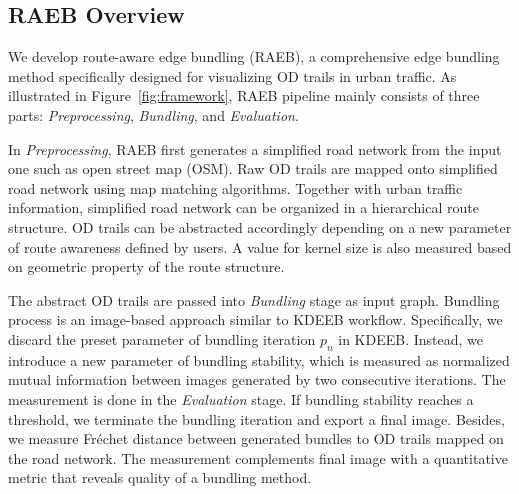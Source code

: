 \subsection{RAEB Overview}
We develop route-aware edge bundling (RAEB), a comprehensive edge bundling method specifically designed for visualizing OD trails in urban traffic.
As illustrated in Figure~\ref{fig:framework}, RAEB pipeline mainly consists of three parts: \textit{Preprocessing}, \textit{Bundling}, and \textit{Evaluation}.

In \textit{Preprocessing}, RAEB first generates a simplified road network from the input one such as open street map (OSM).
Raw OD trails are mapped onto simplified road network using map matching algorithms.
Together with urban traffic information, simplified road network can be organized in a hierarchical route structure.
OD trails can be abstracted accordingly depending on a new parameter of route awareness defined by users.
A value for kernel size is also measured based on geometric property of the route structure.

The abstract OD trails are passed into \textit{Bundling} stage as input graph.
Bundling process is an image-based approach similar to KDEEB workflow.
Specifically, we discard the preset parameter of bundling iteration $p_n$ in KDEEB.
Instead, we introduce a new parameter of bundling stability, which is measured as normalized mutual information between images generated by two consecutive iterations.
The measurement is done in the \textit{Evaluation} stage.
If bundling stability reaches a threshold, we terminate the bundling iteration and export a final image.
Besides, we measure Fréchet distance between generated bundles to OD trails mapped on the road network.
The measurement complements final image with a quantitative metric that reveals quality of a bundling method.